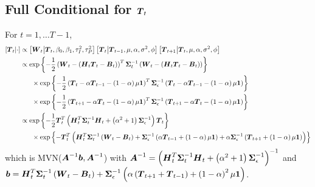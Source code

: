 \documentclass{article}\usepackage[]{graphicx}\usepackage[]{color}
\def\bm#1{\mbox{\boldmath $#1$}}
\begin{document}
\subsection{Full Conditional for $\bm{T}_t$}
%
For $t = 1, \ldots T - 1$,
%
\begin{align*}
%
\left[ \bm{T}_t \middle| \cdot \right] & \propto \left[ \bm{W}_t \middle| \bm{T}_t, \beta_0, \beta_1, \tau^2_I, \tau^2_P \right] \left[ \bm{T}_t \middle| \bm{T}_{t - 1}, \mu, \alpha, \sigma^2, \phi \right] \left[ \bm{T}_{t + 1} \middle| \bm{T}_t, \mu, \alpha, \sigma^2, \phi \right]\\
%
& \propto \exp{ \left\{ - \frac{1} {2} \left( \bm{W}_t - \left( \bm{H}_t \bm{T}_t - \bm{B}_t \right) \right)^T \bm{\Sigma}_t^{ - 1} \left( \bm{W}_t - \left( \bm{H}_t \bm{T}_t - \bm{B}_t \right)  \right) \right\} }\\
& \hspace{6mm} \times \exp{ \left\{ - \frac{1} {2} \left( \bm{T}_t - \alpha \bm{T}_{t - 1} - \left( 1 - \alpha \right) \mu \bm{1} \right)^T \bm{\Sigma}_\epsilon^{ - 1} \left( \bm{T}_t - \alpha \bm{T}_{t - 1} - \left( 1 - \alpha \right) \mu \bm{1} \right) \right\} }\\
& \hspace{6mm} \times \exp{ \left\{ - \frac{1} {2} \left( \bm{T}_{t + 1} - \alpha \bm{T}_t - \left( 1 - \alpha \right) \mu \bm{1} \right)^T \bm{\Sigma}_\epsilon^{ - 1} \left( \bm{T}_{t + 1} - \alpha \bm{T}_t - \left( 1 - \alpha \right) \mu \bm{1} \right) \right\} }\\
%
& \propto \exp{ \left\{ - \frac{1} {2} \bm{T}_t^T \left( \bm{H}_t^T \bm{\Sigma}_t^{ - 1} \bm{H}_t + \left( \alpha^2 + 1 \right) \bm{\Sigma}_\epsilon^{ - 1} \right) \bm{T}_t \right\} }\\
& \hspace{6mm} \times \exp{ \left\{ - \bm{T}_t^T \left( \bm{H}_t^T \bm{\Sigma}_t^{ - 1} \left( \bm{W}_t - \bm{B}_t \right) + \bm{\Sigma}_\epsilon^{ - 1} \left( \alpha \bm{T}_{t - 1} + \left( 1 - \alpha \right) \mu \bm{1} \right) + \alpha \bm{\Sigma}_\epsilon^{ - 1} \left( \bm{T}_{t + 1} + \left( 1 - \alpha \right) \mu \bm{1} \right) \right) \right\} }
%
\end{align*}
%
which is MVN($\bm{A}^{ - 1}\bm{b}, \bm{A}^{ - 1}$) with $\bm{A}^{ - 1} = \left( \bm{H}_t^T \bm{\Sigma}_t^{ - 1} \bm{H}_t + \left( \alpha^2 + 1 \right) \bm{\Sigma}_\epsilon^{ - 1} \right)^{ - 1}$ and $\bm{b} = \bm{H}_t^T \bm{\Sigma}_t^{ - 1} \left( \bm{W}_t - \bm{B}_t \right) + \bm{\Sigma}_\epsilon^{ - 1} \left( \alpha \left( \bm{T}_{t + 1} + \bm{T}_{t - 1} \right) + \left( 1 - \alpha \right)^2 \mu \bm{1} \right) $.\\
\end{document}
